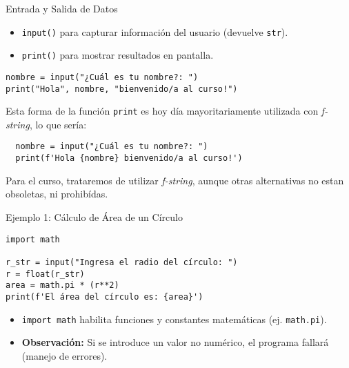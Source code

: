 \documentclass[10pt]{beamer}
\begin{document}
\begin{frame}[fragile]{Entrada y Salida de Datos}
\begin{itemize}
  \item \texttt{input()} para capturar información del usuario (devuelve \texttt{str}).
  \item \texttt{print()} para mostrar resultados en pantalla.
\end{itemize}
\begin{verbatim}
nombre = input("¿Cuál es tu nombre?: ")
print("Hola", nombre, "bienvenido/a al curso!")
\end{verbatim}

Esta forma de la función \texttt{print} es hoy día mayoritariamente utilizada con \textit{f-string}, lo que sería:

\begin{verbatim}
  nombre = input("¿Cuál es tu nombre?: ")
  print(f'Hola {nombre} bienvenido/a al curso!')
  \end{verbatim}

  Para el curso, trataremos de utilizar \textit{f-string}, aunque otras alternativas no estan obsoletas, ni prohibídas.
\end{frame}

\begin{frame}[fragile]{Ejemplo 1: Cálculo de Área de un Círculo}
\begin{verbatim}
import math

r_str = input("Ingresa el radio del círculo: ")
r = float(r_str)
area = math.pi * (r**2)
print(f'El área del círculo es: {area}')
\end{verbatim}
\begin{itemize}
  \item \texttt{import math} habilita funciones y constantes matemáticas (ej. \texttt{math.pi}).
  \item \textbf{Observación:} Si se introduce un valor no numérico, el programa fallará (manejo de errores).
\end{itemize}
\end{frame}
\end{document}
